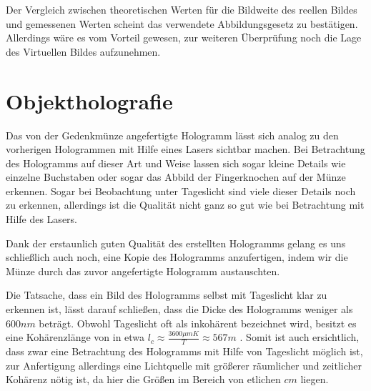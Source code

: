\documentclass[bigchapter,colorback,accentcolor=tud4b,linedtoc,11pt]{tudreport}
\begin{document}
Der Vergleich zwischen theoretischen Werten für die Bildweite des reellen Bildes
und gemessenen Werten scheint das verwendete Abbildungsgesetz zu
bestätigen. Allerdings wäre es vom Vorteil gewesen, zur weiteren Überprüfung
noch die Lage des Virtuellen Bildes aufzunehmen.

\section{Objektholografie}
Das von der Gedenkmünze angefertigte Hologramm lässt sich analog zu den
vorherigen Hologrammen mit Hilfe eines Lasers sichtbar machen. Bei Betrachtung
des Hologramms auf dieser Art und Weise lassen sich sogar kleine Details wie
einzelne Buchstaben oder sogar das Abbild der Fingerknochen auf der Münze
erkennen. Sogar bei Beobachtung unter Tageslicht sind viele dieser Details noch
zu erkennen, allerdings ist die Qualität nicht ganz so gut wie bei Betrachtung
mit Hilfe des Lasers.

Dank der erstaunlich guten Qualität des erstellten Hologramms gelang es uns
schließlich auch noch, eine Kopie des Hologramms anzufertigen, indem wir die
Münze durch das zuvor angefertigte Hologramm austauschten.

Die Tatsache, dass ein Bild des Hologramms selbst mit Tageslicht klar zu
erkennen ist, lässt darauf schließen, dass die Dicke des Hologramms weniger als
$600 nm$ beträgt. Obwohl Tageslicht oft als inkohärent bezeichnet wird,
besitzt es eine Kohärenzlänge von in etwa
$l_c \approx \frac{3600\mu m K}{T} \approx 567 m$ \cite{blackbodycoherence}. Somit ist auch
ersichtlich, dass zwar eine Betrachtung des Hologramms mit Hilfe von Tageslicht
möglich ist, zur Anfertigung allerdings eine Lichtquelle mit größerer räumlicher
und zeitlicher Kohärenz nötig ist, da hier die Größen im Bereich von etlichen
$cm$ liegen.
\end{document}
